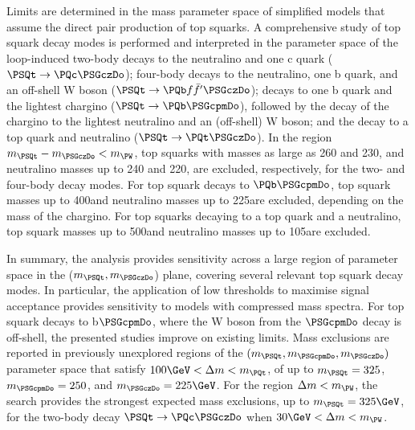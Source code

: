 Limits are determined in the mass parameter space of simplified models
that assume the direct pair production of top squarks. A comprehensive
study of top squark decay modes is performed and interpreted in the
parameter space of the loop-induced two-body decays to the neutralino
and one c quark ($\PSQt \to \PQc\PSGczDo$); four-body
decays to the neutralino, one b quark, and an off-shell W boson
($\PSQt \to {\PQb \ffbp} \PSGczDo$); decays to one b
quark and the lightest chargino ($\PSQt \to \PQb
\PSGcpmDo$), followed by the decay of the chargino to the lightest
neutralino and an (off-shell) W boson; and the decay to a top quark
and neutralino ($\PSQt \to \PQt \PSGczDo$). In the
region $m_{\PSQt} - m_{\PSGczDo} < m_{\PW}$, top squarks with masses
as large as 260 and 230\GeV, and neutralino masses up to 240 and
220\GeV, are excluded, respectively, for the two- and four-body decay
modes. For top squark decays to $\PQb\PSGcpmDo$, top squark masses up to
400\GeV and neutralino masses up to 225\GeV are excluded, depending on
the mass of the chargino. For top squarks decaying to a top quark and
a neutralino, top squark masses up to 500\GeV and neutralino masses up
to 105\GeV are excluded.

In summary, the analysis provides sensitivity across a large region of
parameter space in the ($m_{\PSQt}, m_{\PSGczDo}$) plane, covering
several relevant top squark decay modes. In particular, the
application of low thresholds to maximise signal acceptance provides
sensitivity to models with compressed mass spectra. For top squark
decays to b$\PSGcpmDo$, where the W boson from the $\PSGcpmDo$ decay
is off-shell, the presented studies improve on existing limits.
Mass exclusions are reported in previously unexplored regions of the
$(m_{\PSQt}, m_{\PSGcpmDo}, m_{\PSGczDo})$ parameter space that satisfy
$100\GeV < \dm < m_\PQt$, of up to $m_{\PSQt} = 325$,
$m_{\PSGcpmDo} = 250$, and $m_{\PSGczDo} = 225\GeV$. For the region
$\dm < m_\PW$, the search provides the strongest expected mass
exclusions, up to $m_{\PSQt} = 325\GeV$, for the two-body decay $\PSQt
\to \PQc\PSGczDo$ when $30\GeV < \dm < m_\PW$.


